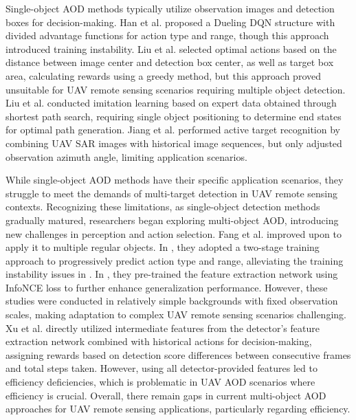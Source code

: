 \documentclass[lettersize,journal]{IEEEtran}
\begin{document}
Single-object AOD methods typically utilize observation images and detection boxes for decision-making. Han et al. \cite{active2019} proposed a Dueling DQN structure with divided advantage functions for action type and range, though this approach introduced training instability. Liu et al. \cite{active2022} selected optimal actions based on the distance between image center and detection box center, as well as target box area, calculating rewards using a greedy method, but this approach proved unsuitable for UAV remote sensing scenarios requiring multiple object detection. Liu et al. \cite{behavior2023} conducted imitation learning based on expert data obtained through shortest path search, requiring single object positioning to determine end states for optimal path generation. Jiang et al. \cite {Azimuth2024} performed active target recognition by combining UAV SAR images with historical image sequences, but only adjusted observation azimuth angle, limiting application scenarios.

While single-object AOD methods have their specific application scenarios, they struggle to meet the demands of multi-target detection in UAV remote sensing contexts. Recognizing these limitations, as single-object detection methods gradually matured, researchers began exploring multi-object AOD, introducing new challenges in perception and action selection. Fang et al. \cite{enhancing2021,selfsupervised2022} improved upon \cite{active2019} to apply it to multiple regular objects. In \cite{enhancing2021}, they adopted a two-stage training approach to progressively predict action type and range, alleviating the training instability issues in \cite{active2019}. In \cite{selfsupervised2022}, they pre-trained the feature extraction network using InfoNCE loss to further enhance generalization performance. However, these studies were conducted in relatively simple backgrounds with fixed observation scales, making adaptation to complex UAV remote sensing scenarios challenging. Xu et al. \cite{dynamic2021} directly utilized intermediate features from the detector's feature extraction network combined with historical actions for decision-making, assigning rewards based on detection score differences between consecutive frames and total steps taken. However, using all detector-provided features led to efficiency deficiencies, which is problematic in UAV AOD scenarios where efficiency is crucial. Overall, there remain gaps in current multi-object AOD approaches for UAV remote sensing applications, particularly regarding efficiency.
\end{document}
